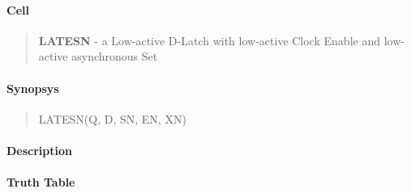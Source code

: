 \label{LATESN}
\paragraph{Cell}
\begin{quote}
    \textbf{LATESN} - a Low-active D-Latch with low-active Clock Enable and low-active asynchronous Set
\end{quote}

\paragraph{Synopsys}
\begin{quote}
    LATESN(Q, D, SN, EN, XN)
\end{quote}

\paragraph{Description}

%

\paragraph{Truth Table}
%

